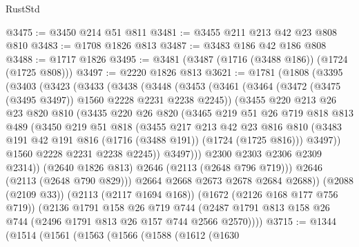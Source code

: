 \begin{lexlean}{RustStd}
\begin{coremodule}
@3475 := @3450 @214 @51 @811
@3481 := @3455 @211 @213 @42 @23 @808 @810
@3483 := @1708 @1826 @813
@3487 := @3483 @186 @42 @186 @808
@3488 := @1717 @1826
@3495 := @3481 (@3487 (@1716 (@3488 @186)) (@1724 (@1725 @808)))
@3497 := @2220 @1826 @813
@3621 := @1781
    (@1808
      (@3395
        (@3403
          (@3423
            (@3433
              (@3438
                (@3448
                  (@3453
                    (@3461
                      (@3464 (@3472 (@3475 (@3495 @3497)) @1560 @2228 @2231 @2238 @2245))
                      (@3455
                        @220
                        @213
                        @26
                        @23
                        @820
                        @810
                        (@3435
                          @220
                          @26
                          @820
                          (@3465
                            @219
                            @51
                            @26
                            @719
                            @818
                            @813
                            @489
                            (@3450
                              @219
                              @51
                              @818
                              (@3455
                                @217
                                @213
                                @42
                                @23
                                @816
                                @810
                                (@3483 @191 @42 @191 @816 (@1716 (@3488 @191)) (@1724 (@1725 @816)))
                                @3497))
                            @1560
                            @2228
                            @2231
                            @2238
                            @2245))
                        @3497)))
                  @2300
                  @2303
                  @2306
                  @2309
                  @2314))
              (@2640 @1826 @813)
              @2646
              (@2113 (@2648 @796 @719)))
            @2646
            (@2113 (@2648 @790 @829)))
          @2664
          @2668
          @2673
          @2678
          @2684
          @2688))
      (@2088 (@2109 @33))
      (@2113 (@2117 @1694 @168))
      (@1672 (@2126 @168 @177 @756 @719))
      (@2136
        @1791
        @158
        @26
        @719
        @744
        (@2487 @1791 @813 @158 @26 @744 (@2496 @1791 @813 @26 @157 @744 @2566 @2570))))
@3715 := @1344
    (@1514
      (@1561
        (@1563
          (@1566
            (@1588
              (@1612
                (@1630

\end{coremodule}
\end{lexlean}
